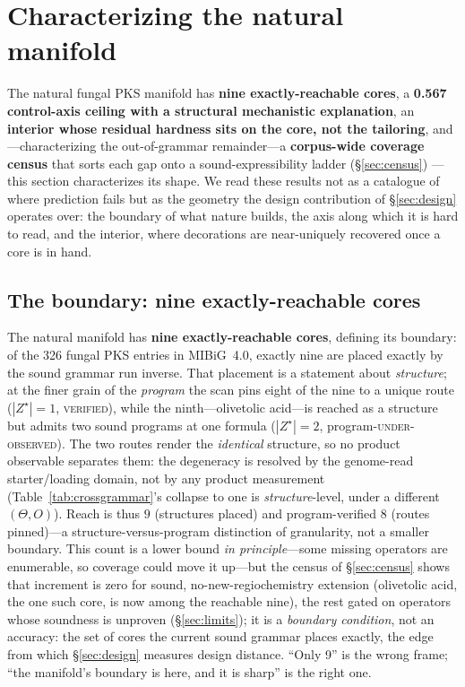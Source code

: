 \section{Characterizing the natural manifold}\label{sec:manifold}

The natural fungal PKS manifold has \textbf{nine exactly-reachable cores}, a \textbf{0.567 control-axis
ceiling with a structural mechanistic explanation}, an \textbf{interior whose residual hardness sits on
the core, not the tailoring}, and---characterizing the out-of-grammar remainder---a
\textbf{corpus-wide coverage census} that sorts each gap onto a sound-expressibility ladder
(\S\ref{sec:census}) --- this section characterizes its shape. We read these results not as a
catalogue of where prediction fails but as the geometry the design contribution of \S\ref{sec:design}
operates over: the boundary of what nature builds, the axis along which it is hard to read, and the
interior, where decorations are near-uniquely recovered once a core is in hand.

\subsection{The boundary: nine exactly-reachable cores}\label{sec:boundary}
The natural manifold has \textbf{nine exactly-reachable cores}, defining its boundary: of the 326 fungal
PKS entries in MIBiG~4.0, exactly nine are placed exactly by the sound grammar run inverse. That placement is a statement about
\emph{structure}; at the finer grain of the \emph{program} the scan pins eight of the nine to a unique
route ($|Z^{\star}|{=}1$, \textsc{verified}), while the ninth---olivetolic acid---is reached as a structure
but admits two sound programs at one formula ($|Z^{\star}|{=}2$, program-\textsc{under-observed}). The two
routes render the \emph{identical} structure, so no product observable separates them: the degeneracy is
resolved by the genome-read starter/loading domain, not by any product measurement
(Table~\ref{tab:crossgrammar}'s collapse to one is \emph{structure}-level, under a different $(\Theta,O)$). Reach is thus $9$
(structures placed) and program-verified $8$ (routes pinned)---a structure-versus-program distinction of
granularity, not a smaller boundary. This count is
a lower bound \emph{in principle}---some missing operators are enumerable, so coverage could move it
up---but the census of \S\ref{sec:census} shows that increment is zero for sound, no-new-regiochemistry
extension (olivetolic acid, the one such core, is now among the reachable nine), the rest gated on
operators whose soundness is unproven (\S\ref{sec:limits}); it is a
\emph{boundary condition}, not an accuracy: the
set of cores the current sound grammar places exactly, the edge from which \S\ref{sec:design} measures
design distance. ``Only 9'' is the wrong frame; ``the manifold's boundary is here, and it is sharp'' is
the right one.

